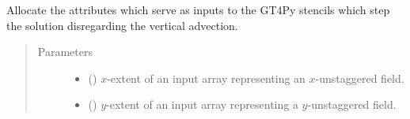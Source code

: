 \documentclass[letterpaper,10pt,english]{sphinxmanual}
\begin{document}
\begin{fulllineitems}
\begin{fulllineitems}
\begin{quote}
\begin{description}
\end{description}\end{quote}

\end{fulllineitems}


\begin{fulllineitems}
\label{\detokenize{api:dycore.prognostic_isentropic_nonconservative.PrognosticIsentropicNonconservative._stencils_stepping_by_neglecting_vertical_advection_allocate_inputs}}
Allocate the attributes which serve as inputs to the GT4Py stencils which step the solution
disregarding the vertical advection.
\begin{quote}\begin{description}
\item[{Parameters}] \leavevmode\begin{itemize}
\item {} 
 () \textendash{} \(x\)-extent of an input array representing an \(x\)-unstaggered field.

\item {} 
 () \textendash{} \(y\)-extent of an input array representing a \(y\)-unstaggered field.

\end{itemize}

\end{description}\end{quote}

\end{fulllineitems}



\end{fulllineitems}
\end{document}

